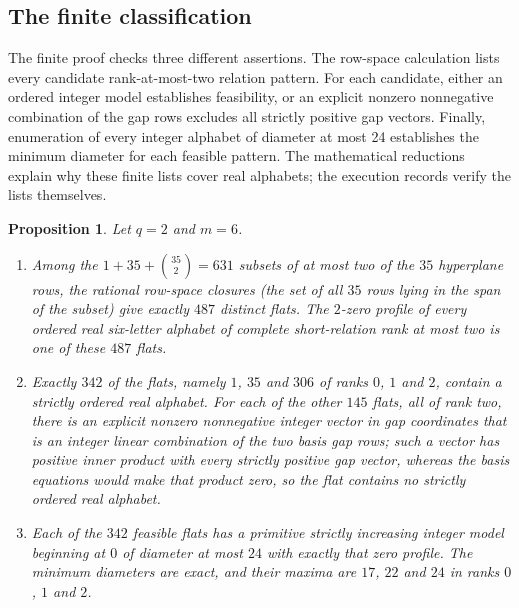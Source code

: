 \documentclass[11pt,reqno]{amsart}
\theoremstyle{plain}
\newtheorem{proposition}[theorem]{Proposition}
\theoremstyle{definition}
\theoremstyle{plain}
\theoremstyle{plain}
\theoremstyle{plain}
\theoremstyle{plain}
\theoremstyle{plain}
\theoremstyle{plain}
\theoremstyle{definition}
\theoremstyle{definition}
\theoremstyle{definition}
\theoremstyle{plain}
\begin{document}
\subsection{The finite classification}
The finite proof checks three different assertions. The row-space calculation
lists every candidate rank-at-most-two relation pattern. For each candidate,
either an ordered integer model establishes feasibility, or an explicit
nonzero nonnegative combination of the gap rows excludes all strictly positive
gap vectors. Finally, enumeration of every integer alphabet of diameter at
most 24 establishes the minimum diameter for each feasible pattern. The
mathematical reductions explain why these finite lists cover real alphabets;
the execution records verify the lists themselves.

\begin{proposition}\label{M-prop:six-classification}
Let $q=2$ and $m=6$.
\begin{enumerate}
\item Among the $1+35+\binom{35}2=631$ subsets of at most two of the $35$
 hyperplane rows, the rational row-space closures (the set of all $35$ rows
 lying in the span of the subset) give exactly $487$ distinct flats. The
 $2$-zero profile of every ordered real six-letter alphabet of complete
 short-relation rank at most two is one of these $487$ flats.
\item Exactly $342$ of the flats, namely $1$, $35$ and $306$ of ranks $0$,
 $1$ and $2$, contain a strictly ordered real alphabet. For each of the
 other $145$ flats, all of rank two, there is an explicit nonzero nonnegative
 integer vector in gap coordinates that is an integer linear combination of
 the two basis gap rows; such a vector has positive inner product with every
 strictly positive gap vector, whereas the basis equations would make that
 product zero, so the flat contains no strictly ordered real alphabet.
\item Each of the $342$ feasible flats has a primitive strictly increasing
 integer model beginning at $0$ of diameter at most $24$ with exactly that
 zero profile. The minimum diameters are exact, and their maxima are $17$,
 $22$ and $24$ in ranks $0$, $1$ and $2$.
\end{enumerate}
\end{proposition}
\end{document}
